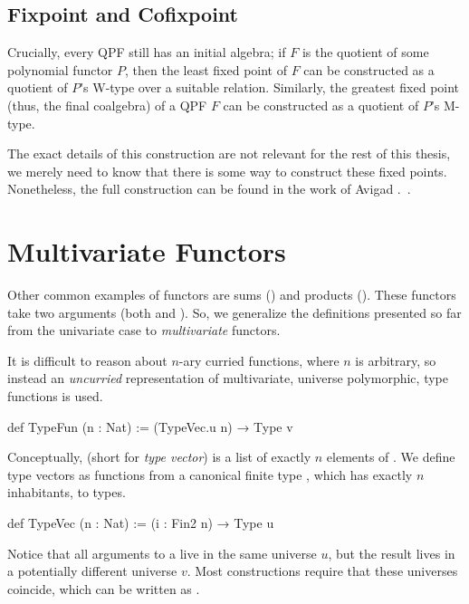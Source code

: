 \subsection*{Fixpoint and Cofixpoint}
Crucially, every QPF still has an initial algebra; if $F$ is the quotient of some polynomial functor
$P$, then the least fixed point of $F$ can be constructed as a quotient of $P$'s W-type over a suitable
relation.
Similarly, the greatest fixed point (thus, the final coalgebra) of a QPF $F$ can be constructed as
a quotient of $P$'s M-type.

The exact details of this construction are not relevant for the rest of this thesis, we merely need to know that there is some way to construct these fixed points. Nonetheless, the full construction can be found in the work of Avigad \etal{}.~\cite{avigadDataTypesQuotients2019a}.







\section{Multivariate Functors}%
\label{sec:mvfunctor}

Other common examples of functors are sums () and products ().
These functors take two arguments (both  and ).
So, we generalize the definitions presented so far from the univariate case to \emph{multivariate} functors.

It is difficult to reason about $n$-ary curried functions, where $n$ is arbitrary, so instead an \emph{uncurried} representation of multivariate, universe polymorphic, type functions is used.

\begin{leancode}
    def TypeFun (n : Nat) := (TypeVec.{u} n) → Type v
\end{leancode}
Conceptually,  (short for \emph{type vector}) is a list of exactly $n$ elements of .
We define type vectors as functions from a canonical finite type , which has exactly $n$ inhabitants,
to types.
\begin{leancode}
    def TypeVec (n : Nat) := (i : Fin2 n) → Type u
\end{leancode}
Notice that all arguments to a  live in the same universe $u$, but the result lives in a potentially different universe $v$. 
Most constructions require that these universes coincide, which can be written as .

